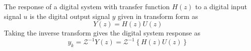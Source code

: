 The
response of a digital system with transfer function $H(z)$ to a
digital input signal $u$ is the digital output signal
$y$ given in transform form as
\begin{equation}\label{eq:l10e1}
  Y(z) =H(z) U(z)
\end{equation}
Taking the inverse transform gives the digital system response as
\begin{equation}\label{eq:l10e2}
  y_k = \mathcal{Z}^{-1}Y(z) = \mathcal{Z}^{-1} \left\{H(z)
  U(z)\right\}
\end{equation}
\endinput

